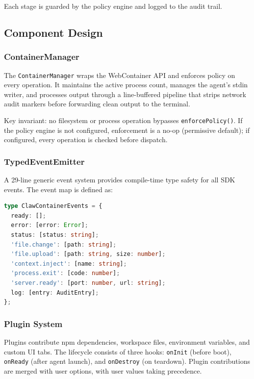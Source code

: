 \documentclass[11pt,twocolumn]{article}
\begin{document}
Each stage is guarded by the policy engine and logged to the audit trail.

\subsection{Component Design}

\subsubsection{ContainerManager}

The \texttt{ContainerManager} wraps the WebContainer API and enforces policy on every operation. It maintains the active process count, manages the agent's stdin writer, and processes output through a line-buffered pipeline that strips network audit markers before forwarding clean output to the terminal.

Key invariant: no filesystem or process operation bypasses \texttt{enforcePolicy()}. If the policy engine is not configured, enforcement is a no-op (permissive default); if configured, every operation is checked before dispatch.

\subsubsection{TypedEventEmitter}

A 29-line generic event system provides compile-time type safety for all SDK events. The event map is defined as:

\begin{lstlisting}[language=TypeScript]
type ClawContainerEvents = {
  ready: [];
  error: [error: Error];
  status: [status: string];
  'file.change': [path: string];
  'file.upload': [path: string, size: number];
  'context.inject': [name: string];
  'process.exit': [code: number];
  'server.ready': [port: number, url: string];
  log: [entry: AuditEntry];
};
\end{lstlisting}

\subsubsection{Plugin System}

Plugins contribute npm dependencies, workspace files, environment variables, and custom UI tabs. The lifecycle consists of three hooks: \texttt{onInit} (before boot), \texttt{onReady} (after agent launch), and \texttt{onDestroy} (on teardown). Plugin contributions are merged with user options, with user values taking precedence.
\end{document}
